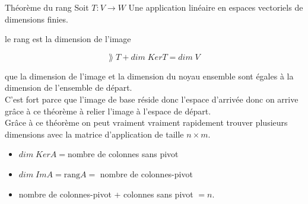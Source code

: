\begin{parag}{Théorème du rang}
Soit $T: V \to W$ Une application linéaire en espaces vectoriels de dimensions finies.
    \begin{truc} 
        le rang est la dimension de l'image
    \end{truc}
    \begin{truc}
        \begin{formule}
            \[\rang\; T + dim\; KerT = dim\; V\]
        \end{formule}
    \end{truc}
    que la dimension de l'image et la dimension du noyau ensemble sont égales à la dimension de l'ensemble de départ.\\
    C'est fort parce que l'image de base réside donc l'espace d'arrivée donc on arrive grâce à ce théorème à relier l'image à l'espace de départ. 
    \\
    Grâce à ce théorème on peut vraiment vraiment rapidement trouver plusieurs dimensions avec la matrice d'application de taille $n \times m$.
    \begin{itemize}
        \item $dim\; KerA = $nombre de colonnes sans pivot
        \item $dim\; ImA = \text{rang}A = $ nombre de colonnes-pivot
        \item nombre de colonnes-pivot + colonnes sans pivot $= n$.
    \end{itemize}
\end{parag}

